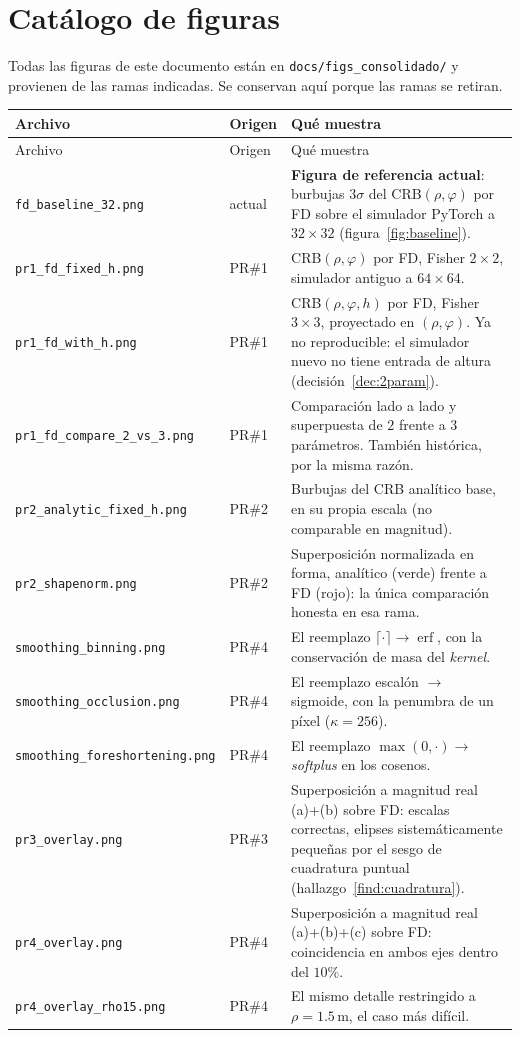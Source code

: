 \documentclass[11pt,a4paper]{article}
\newcommand{\erf}{\operatorname{erf}}
\newcommand{\code}[1]{\texttt{#1}}
\theoremstyle{definition}
\begin{document}
\section{Catálogo de figuras}
\label{sec:catalogo}

Todas las figuras de este documento están en \code{docs/figs\_consolidado/} y
provienen de las ramas indicadas. Se conservan aquí porque las ramas se
retiran.

\small
\begin{longtable}{@{}p{5.4cm}p{1.6cm}p{8.1cm}@{}}
\toprule
Archivo & Origen & Qué muestra \\
\midrule
\endfirsthead
\toprule
Archivo & Origen & Qué muestra \\
\midrule
\endhead
\code{fd\_baseline\_32.png} & actual &
  \textbf{Figura de referencia actual}: burbujas $3\sigma$ del
  CRB$(\rho,\varphi)$ por FD sobre el simulador PyTorch a $32\times32$
  (figura~\ref{fig:baseline}). \\
\addlinespace
\code{pr1\_fd\_fixed\_h.png} & PR\#1 &
  CRB$(\rho,\varphi)$ por FD, Fisher $2\times2$, simulador antiguo a
  $64\times64$. \\
\code{pr1\_fd\_with\_h.png} & PR\#1 &
  CRB$(\rho,\varphi,h)$ por FD, Fisher $3\times3$, proyectado en
  $(\rho,\varphi)$. Ya no reproducible: el simulador nuevo no tiene entrada de
  altura (decisión~\ref{dec:2param}). \\
\code{pr1\_fd\_compare\_2\_vs\_3.png} & PR\#1 &
  Comparación lado a lado y superpuesta de $2$ frente a $3$ parámetros.
  También histórica, por la misma razón. \\
\addlinespace
\code{pr2\_analytic\_fixed\_h.png} & PR\#2 &
  Burbujas del CRB analítico base, en su propia escala (no comparable en
  magnitud). \\
\code{pr2\_shapenorm.png} & PR\#2 &
  Superposición normalizada en forma, analítico (verde) frente a FD (rojo):
  la única comparación honesta en esa rama. \\
\addlinespace
\code{smoothing\_binning.png} & PR\#4 &
  El reemplazo $\lceil\cdot\rceil\to\erf$, con la conservación de masa del
  \emph{kernel}. \\
\code{smoothing\_occlusion.png} & PR\#4 &
  El reemplazo escalón $\to$ sigmoide, con la penumbra de un píxel
  ($\kappa=256$). \\
\code{smoothing\_foreshortening.png} & PR\#4 &
  El reemplazo $\max(0,\cdot)\to$ \emph{softplus} en los cosenos. \\
\addlinespace
\code{pr3\_overlay.png} & PR\#3 &
  Superposición a magnitud real (a)+(b) sobre FD: escalas correctas, elipses
  sistemáticamente pequeñas por el sesgo de cuadratura puntual
  (hallazgo~\ref{find:cuadratura}). \\
\addlinespace
\code{pr4\_overlay.png} & PR\#4 &
  Superposición a magnitud real (a)+(b)+(c) sobre FD: coincidencia en ambos
  ejes dentro del $10\%$. \\
\code{pr4\_overlay\_rho15.png} & PR\#4 &
  El mismo detalle restringido a $\rho=1.5\,$m, el caso más difícil. \\
\bottomrule
\end{longtable}
\end{document}
